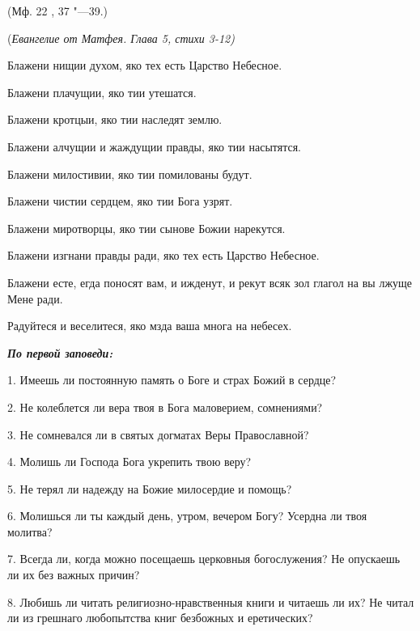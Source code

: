 (Мф. 22 , 37 "---39.) 





\bigskip\bigskip\mychapterending

 


(\itshape Евангелие от Матфея. Глава 5, стихи 3-12) 

\normalfont{}

Блажени нищии духом, яко тех есть Царство Небесное. 

Блажени плачущии, яко тии утешатся. 

Блажени кротцыи, яко тии наследят землю. 

Блажени алчущии и жаждущии правды, яко тии насытятся. 

Блажени милостивии, яко тии помилованы будут. 

Блажени чистии сердцем, яко тии Бога узрят. 

Блажени миротворцы, яко тии сынове Божии нарекутся. 

Блажени изгнани правды ради, яко тех есть Царство Небесное. 

Блажени есте, егда поносят вам, и ижденут, и рекут всяк зол глагол на вы лжуще Мене ради. 

Радуйтеся и веселитеся, яко мзда ваша многа на небесех. 


\bigskip\bigskip\mychapterending

 


\bfseries \itshape По первой заповеди: 

\normalfont{}\normalfont{}1. Имеешь ли постоянную память о Боге и страх Божий в сердце?

2. Не колеблется ли вера твоя в Бога маловерием, сомнениями?

3. Не сомневался ли в святых догматах Веры Православной?

4. Молишь ли Господа Бога укрепить твою веру?

5. Не терял ли надежду на Божие милосердие и помощь?

6. Молишься ли ты каждый день, утром, вечером Богу? Усердна ли твоя молитва?

7. Всегда ли, когда можно посещаешь церковныя богослужения? Не опускаешь ли их без важных причин?

8. Любишь ли читать религиозно-нравственныя книги и читаешь ли их? Не читал ли из грешнаго любопытства книг безбожных и еретических?

